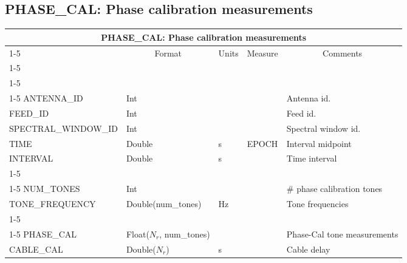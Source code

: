 \documentclass{article}
\newcommand{\nr}{$N_r$}
\newcommand{\defline}[1]{\cline{1-5}
\multicolumn{5}{|l|}{#1} \\
\cline{1-5}}
\newcommand{\definetable}[2]
{
	\vfill\newpage
	\subsection{#1}
        \vspace{0.15in}
        \small
	\begin{tabular}{|l|p{1.25in}|l|p{.9in}|p{1.4in}|}
	\hline
	\multicolumn{5}{|c|}{\bf #1}\\ 
	\cline{1-5}
        \multicolumn{1}{|c|}{Name}&\multicolumn{1}{|c|}{Format}&
        \multicolumn{1}{|c|}{Units}&\multicolumn{1}{|c|}{Measure}&
        \multicolumn{1}{|c|}{Comments}\\
        \cline{1-5}
        #2
        \hline
	\end{tabular}
}
\begin{document}
\definetable{PHASE\_CAL: Phase calibration measurements}
{
\defline{\bf Columns}
\defline{\bf Keys}
ANTENNA\_ID & Int         &      &       & Antenna id.\\
FEED\_ID    & Int         &      &       & Feed id.\\
SPECTRAL\_WINDOW\_ID & Int &     &       & Spectral window id.\\
TIME        & Double      & s    & EPOCH & Interval midpoint \\
INTERVAL    & Double      & s    &       & Time interval\\
\defline{\em Data description}
NUM\_TONES  & Int         &      &       & \# phase calibration tones\\
TONE\_FREQUENCY & Double(num\_tones) & Hz & & Tone frequencies\\
\defline{\em Data}
PHASE\_CAL  & Float(\nr, num\_tones) & & & Phase-Cal tone measurements\\
CABLE\_CAL  & Double(\nr) & s    &       & Cable delay\\
}
\end{document}
